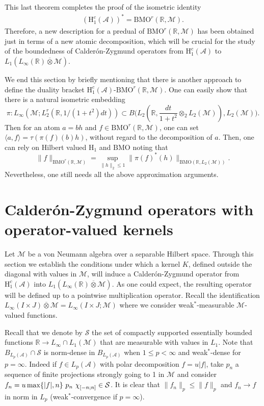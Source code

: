 \documentclass[psamsfonts]{amsart}
\newcommand{\R}{\mathbb{R}}
\newcommand*{\bigchi}{\mbox{\large$\chi$}}
\newcommand{\la}{\langle}
\newcommand{\ra}{\rangle}
\newcommand{\Lp}{L_p}
\newcommand{\Lone}{L_1}
\newcommand{\Linfty}{L_\infty}
\newcommand{\Ltwo}{L_2}
\newcommand{\Ltwor}{L_2^r}
\newcommand{\Hone}{\mathrm{H}_1}
\newcommand{\Honec}{\mathrm{H}_1^c}
\newcommand{\BMOr}{\mathrm{BMO}^r}
\newcommand{\BMO}{\mathrm{BMO}}
\newcommand{\Hardyc}{\Honec(\mathcal{A})}
\newcommand{\Avnat}{\Linfty(\mathbb{R}) \overline{\otimes} \mathcal{M}}
\begin{document}
    
    This last theorem completes the proof of the isometric identity
    \begin{align*}
        (\Hardyc)^* = \BMOr(\mathbb{R},\mathcal{M}).
    \end{align*}
    Therefore, a new description for a predual of
    $\BMOr(\mathbb{R},\mathcal{M})$ has been obtained just in terms of
    a new atomic decomposition, which will be crucial for the study of
    the boundedness of Calder\'on-Zygmund operators from $\Hardyc$ to
    $\Lone(\Avnat)$.


    \medskip
    
    We end this section by briefly mentioning that there is another approach
    to define the duality bracket $\Hardyc$-$\BMOr(\mathbb{R},\mathcal{M})$.
    One can easily show that there is a natural isometric embedding
    $$\pi : \Linfty(\mathcal M;\Ltwor(\R, 1/(1+t^2)dt))\subset B\big(\Ltwo(\R, \frac{dt}{1+t^2} \otimes_2\Ltwo(\mathcal M)), \Ltwo(\mathcal M)\big).$$
    Then for an atom $a=bh$ and $f\in \BMOr(\mathbb{R},\mathcal{M})$,
    one can set $\la a, f\ra=\tau( \pi(f)(b)h)$, without regard to the decomposition of $a$. Then, one can rely on Hilbert valued $\Hone$ and $\BMO$ noting that 
    $$\|f\|_{\BMOr(\mathbb{R},\mathcal{M})}=\sup_{\|h\|_2\leq 1} \| \pi(f)^*(h)\|_{\BMO(\R,\Ltwo(\mathcal M))}.$$
    Nevertheless, one still needs all the above approximation arguments.
    
       \section{Calder\'on-Zygmund operators with operator-valued kernels}

    Let $\mathcal{M}$ be a von Neumann algebra over a separable Hilbert space. Through this section we establish the conditions under which a kernel $K$, defined outside the diagonal with values in $\mathcal{M}$, will induce a Calder\'on-Zygmund operator from $\Hardyc$ into $\Lone(\Linfty(\mathbb{R}) \overline{\otimes} \mathcal{M})$. As one could expect, the resulting operator will be defined up to a pointwise multiplication operator. Recall the identification
    $\Linfty(I \times J) \overline{\otimes} \mathcal{M}=L_\infty(I \times J;\mathcal{M})$ where we consider weak$^*$-measurable $\mathcal M$-valued functions.

    Recall that we denote by $\mathcal S$ the set of compactly supported   essentially bounded functions $\mathbb R\to L_\infty\cap L_1(\mathcal M)$ that are measurable with values in $L_1$. Note that $B_{\Lp(\mathcal A)}\cap \mathcal S$ is norm-dense in $B_{\Lp(\mathcal A)}$ when $1\leq p<\infty$ and weak$^*$-dense for $p=\infty$. Indeed
      if $f\in \Lp(\mathcal A)$ with polar decomposition $f=u|f|$, take $p_n$ a sequence of finite projections strongly going to 1 in $\mathcal M$ and consider
      $f_n=u\max\{|f|,n\} \ p_n \ \bigchi_{[-n;n]}\in \mathcal S$. It is clear that $\|f_n\|_p\leq \|f\|_p$ and $f_n\to f$ in norm in $L_p$ (weak$^*$-convergence if $p=\infty$).
\end{document}
